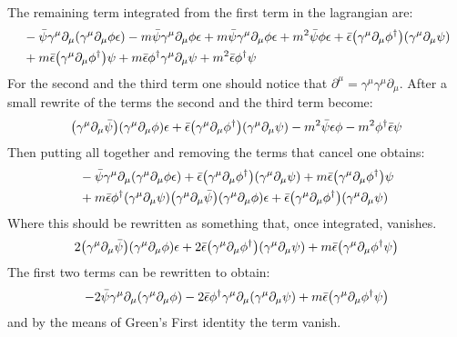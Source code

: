 \documentclass[11pt, oneside]{article}   	%
\begin{document}
\begin{enumerate}[label=\alph*)]
The remaining term integrated from the first term in the lagrangian are:
\begin{align*}
	&-\bar{\psi} \gamma^\mu\partial_\mu\qty( \gamma^\mu\partial_\mu \phi \epsilon) - m \bar{\psi}\gamma^\mu\partial_\mu\phi \epsilon + m\bar{\psi} \gamma^\mu\partial_\mu \phi \epsilon + m^2 \bar{\psi} \phi \epsilon + \bar{\epsilon} \qty(\gamma^\mu\partial_\mu\phi^\dagger)\qty(\gamma^\mu\partial_\mu\psi) \\
	&+m\bar{\epsilon} \qty( \gamma^\mu\partial_\mu\phi^\dagger) \psi+ m\bar{\epsilon} \phi^\dagger \gamma^\mu\partial_\mu\psi + m^2\bar{\epsilon} \phi^\dagger \psi
\end{align*}
For the second and the third term one should notice that $\partial^\mu = \gamma^\mu \gamma^\mu \partial_\mu$. After a small rewrite of the terms the second and the third term become:
\begin{align*}
	\qty(\gamma^\mu\partial_\mu\bar{\psi} ) \qty( \gamma^\mu\partial_\mu\phi ) \epsilon + \bar{\epsilon}  \qty(\gamma^\mu\partial_\mu \phi^\dagger) \qty(\gamma^\mu\partial_\mu \psi) -m^2 \bar{\psi} \epsilon \phi - m^2 \phi^\dagger \bar{\epsilon} \psi
\end{align*}
Then putting all together and removing the terms that cancel one obtains:
\begin{align*}
	&-\bar{\psi} \gamma^\mu\partial_\mu\qty( \gamma^\mu\partial_\mu \phi \epsilon) + \bar{\epsilon} \qty(\gamma^\mu\partial_\mu\phi^\dagger)\qty(\gamma^\mu\partial_\mu\psi) +m\bar{\epsilon} \qty( \gamma^\mu\partial_\mu\phi^\dagger) \psi \\
	&+ m\bar{\epsilon} \phi^\dagger \qty(\gamma^\mu\partial_\mu\psi) \qty(\gamma^\mu\partial_\mu\bar{\psi} ) \qty( \gamma^\mu\partial_\mu\phi ) \epsilon + \bar{\epsilon}  \qty(\gamma^\mu\partial_\mu \phi^\dagger) \qty(\gamma^\mu\partial_\mu \psi)
\end{align*}
Where this should be rewritten as something that, once integrated, vanishes. 
\[
	2\qty(\gamma^\mu \partial_\mu \bar{\psi}) \qty( \gamma^\mu \partial_\mu \phi ) \epsilon + 2 \bar{\epsilon} \qty( \gamma^\mu \partial_\mu \phi^\dagger ) \qty( \gamma^\mu \partial_\mu \psi ) + m\bar{\epsilon} \qty(\gamma^\mu \partial_\mu \phi^\dagger \psi)
\]
The first two terms can be rewritten to obtain:
\[
	-2 \bar{\psi} \gamma^\mu \partial_\mu \qty(\gamma^\mu \partial_\mu \phi)  -2 \bar{\epsilon} \phi^\dagger \gamma^\mu \partial_\mu \qty(\gamma^\mu \partial_\mu \psi) + m\bar{\epsilon} \qty(\gamma^\mu \partial_\mu \phi^\dagger \psi)
\]
and by the means of Green's First identity the term vanish.

\end{enumerate}
\end{document}

